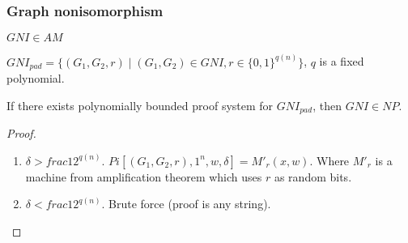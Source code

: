 \begin{frame}
    \frametitle{Graph nonisomorphism}

    \begin{theorem}
    	$GNI \in AM$    
    \end{theorem}
    
	\pause
    \begin{definition}
        $GNI_{pad} = \{(G_1, G_2, r) \mid (G_1, G_2) \in GNI,
        r \in \{0, 1\}^{q(n)}\}$, $q$ is a fixed polynomial.
    \end{definition}

    \pause
    \begin{lemma}
        If there exists polynomially bounded proof system for
        $GNI_{pad}$, then $GNI \in NP$.
    \end{lemma}

    \begin{proof}
        \begin{enumerate}
        	\item $\delta > frac{1}{2^{q(n)}}$. $Pi[(G_1, G_2, r), 1^n, w, \delta] =
        		M'_r(x, w)$. Where $M'_r$ is a machine from amplification theorem
                which uses $r$ as random bits.
            \item $\delta < frac{1}{2^{q(n)}}$. Brute force (proof is any string).
        \end{enumerate}
    \end{proof}
\end{frame}